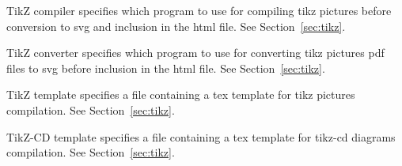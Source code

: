 \begin{configuration}{TikZ compiler}
specifies which program to use for compiling tikz pictures before
conversion to svg and inclusion in the html file. See
Section~\ref{sec:tikz}.
\end{configuration}

\begin{configuration}{TikZ converter}
specifies which program to use for converting tikz pictures pdf files
to svg before inclusion in the html file. See
Section~\ref{sec:tikz}.
\end{configuration}

\begin{configuration}{TikZ template}
specifies a file containing a tex template for tikz pictures
compilation. See Section~\ref{sec:tikz}.
\end{configuration}

\begin{configuration}{TikZ-CD template}
specifies a file containing a tex template for tikz-cd diagrams
compilation. See Section~\ref{sec:tikz}.
\end{configuration}
